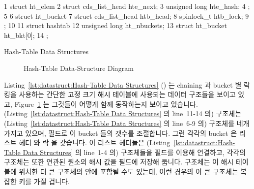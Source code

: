 \begin{listing}[tb]
{ \scriptsize
\begin{verbbox}
 1 struct ht_elem {
 2   struct cds_list_head hte_next;
 3   unsigned long hte_hash;
 4 };
 5 
 6 struct ht_bucket {
 7   struct cds_list_head htb_head;
 8   spinlock_t htb_lock;
 9 };
10 
11 struct hashtab {
12   unsigned long ht_nbuckets;
13   struct ht_bucket ht_bkt[0];
14 };
\end{verbbox}
}
\centering
\theverbbox
\caption{Hash-Table Data Structures}
\label{lst:datastruct:Hash-Table Data Structures}
\end{listing}

\begin{figure}[tb]
\centering
{}
\caption{Hash-Table Data-Structure Diagram}
\label{fig:datastruct:Hash-Table Data-Structure Diagram}
\end{figure}

Listing~\ref{lst:datastruct:Hash-Table Data Structures}
()
는 chaining 과 bucket 별 락킹을 사용하는 간단한 고정 크기 해시 테이블에
사용되는 데이터 구조들을 보이고 있고,
Figure~\ref{fig:datastruct:Hash-Table Data-Structure Diagram} 는 그것들이
어떻게 함께 동작하는지 보이고 있습니다.
(Listing~\ref{lst:datastruct:Hash-Table Data Structures} 의 line~11-14 의)
 구조체는
(Listing~\ref{lst:datastruct:Hash-Table Data Structures} 의 line~6-9 의)
 구조체를 네개 가지고 있으며,  필드로 이
bucket 들의 갯수를 조절합니다.
그런 각각의 bucket 은 리스트 헤더  와 락  을
갖습니다.
이 리스트 헤더들은
(Listing~\ref{lst:datastruct:Hash-Table Data Structures} 의 line~1-4 의)
 구조체들을  필드를 이용해 연결하고, 각각의
 구조체는 또한 연관된 원소의 해시 값을  필드에
저장해 둡니다.
 구조체는 이 해시 테이블에 위치한 더 큰 구조체의 안에 포함될 수도
있는데, 이런 경우의 이 큰 구조체는 복잡한 키를 가질 겁니다.

